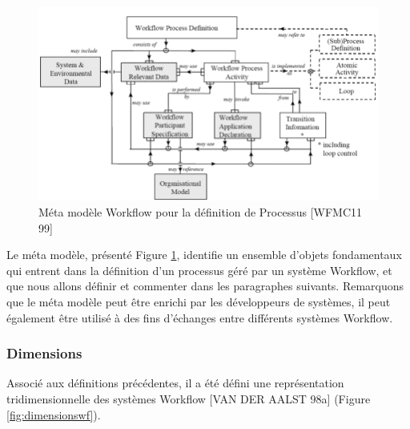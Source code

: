  	 
 	 
 	 
\begin{figure}[h]
	\centering
	\includegraphics[width=1\linewidth]{images/MetaMWFMC11-99}
	\caption{Méta modèle Workflow pour la définition de Processus [WFMC11 99]}
	\label{fig:metamwfmc11-99}
\end{figure}
 	 
 	 Le méta modèle, présenté Figure \ref{fig:metamwfmc11-99}, identifie un ensemble d’objets fondamentaux qui entrent dans la définition d’un processus géré par un système Workflow, et que nous allons définir et commenter dans les paragraphes suivants. Remarquons que le méta modèle peut être enrichi par les développeurs de systèmes, il peut également être utilisé à des fins d’échanges entre différents systèmes Workflow.
 	 
 	 
 	 \subsubsection{Dimensions}
 	 Associé aux définitions précédentes, il a été défini une représentation tridimensionnelle des systèmes Workflow [VAN DER AALST 98a] (Figure \ref{fig:dimensionswf}). 
 	 
